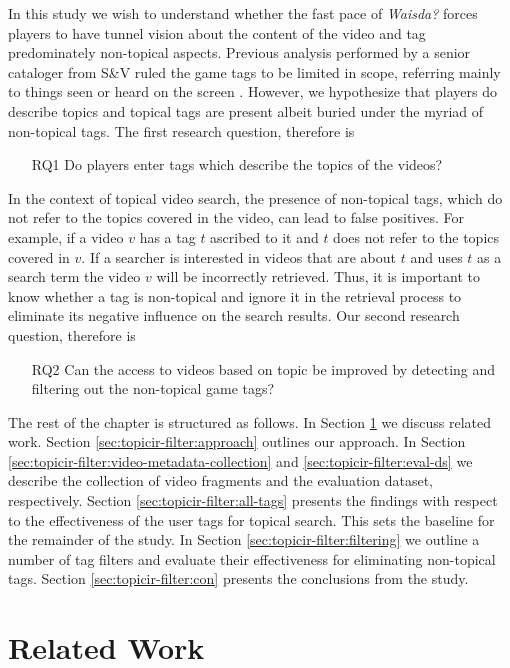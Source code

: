 In this study we wish to understand whether the fast pace of \textit{Waisda?} forces players to have tunnel vision about the content of the video and tag predominately non-topical aspects.
Previous analysis performed by a senior cataloger from S\&V ruled the game tags to be limited in scope, referring mainly to things seen or heard on the screen \cite{waisda-lotte}.
However, we hypothesize that players do describe topics and topical tags are present albeit buried under the myriad of non-topical tags. The first research question, therefore is
\begin{itemize}
\item[RQ1] Do players enter tags which describe the topics of the videos?
\end{itemize}
In the context of topical video search, the presence of non-topical tags, which do not refer to the topics covered in the video, can lead to false positives. For example, if a video $v$ has a tag $t$ ascribed to it and $t$ does not refer to the topics covered in $v$. If a searcher is interested in videos that are about $t$ and uses $t$ as a search term the video $v$ will be incorrectly retrieved. Thus, it is important to know whether a tag is non-topical and ignore it in the retrieval process to eliminate its negative influence on the search results. Our second research question, therefore is
\begin{itemize}
\item[RQ2] Can the access to videos based on topic be improved by detecting and filtering out the non-topical game tags?
\end{itemize}

The rest of the chapter is structured as follows. In Section \ref{sec:topicir-filter:relatedwork} we discuss related work. Section \ref{sec:topicir-filter:approach} outlines our approach. In Section \ref{sec:topicir-filter:video-metadata-collection} and \ref{sec:topicir-filter:eval-ds} we describe the collection of video fragments and the evaluation dataset, respectively. Section \ref{sec:topicir-filter:all-tags} presents the findings with respect to the effectiveness of the user tags for topical search. This sets the baseline for the remainder of the study. In Section \ref{sec:topicir-filter:filtering} we outline a number of tag filters and evaluate their effectiveness for eliminating non-topical tags. Section \ref{sec:topicir-filter:con} presents the conclusions from the study.

\section{Related Work}\label{sec:topicir-filter:relatedwork}
